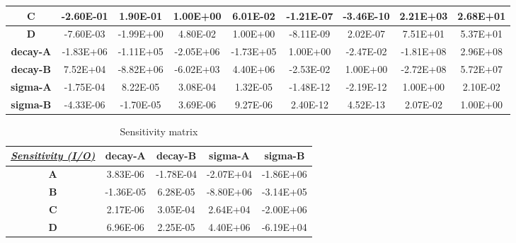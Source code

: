 \begin{landscape}
\begin{table}[h!]
\begin{tabular}{|c|c|c|c|c|c|c|c|c|}
\textbf{C}                                   & -2.60E-01  & 1.90E-01   & 1.00E+00   & 6.01E-02   & -1.21E-07        & -3.46E-10        & 2.21E+03         & 2.68E+01         \\ \hline
\textbf{D}                                   & -7.60E-03  & -1.99E+00  & 4.80E-02   & 1.00E+00   & -8.11E-09        & 2.02E-07         & 7.51E+01         & 5.37E+01         \\ \hline
\textbf{decay-A}                             & -1.83E+06  & -1.11E+05  & -2.05E+06  & -1.73E+05  & 1.00E+00         & -2.47E-02        & -1.81E+08        & 2.96E+08         \\ \hline
\textbf{decay-B}                             & 7.52E+04   & -8.82E+06  & -6.02E+03  & 4.40E+06   & -2.53E-02        & 1.00E+00         & -2.72E+08        & 5.72E+07         \\ \hline
\textbf{sigma-A}                             & -1.75E-04  & 8.22E-05   & 3.08E-04   & 1.32E-05   & -1.48E-12        & -2.19E-12        & 1.00E+00         & 2.10E-02         \\ \hline
\textbf{sigma-B}                             & -4.33E-06  & -1.70E-05  & 3.69E-06   & 9.27E-06   & 2.40E-12         & 4.52E-13         & 2.07E-02         & 1.00E+00         \\ \hline
\end{tabular}
\end{table}
\begin{table}[h!]
\centering
\caption{Sensitivity matrix}
\label{SensitivityComputed}
\begin{tabular}{|c|c|c|c|c|}
\hline
{\ul \textit{\textbf{Sensitivity (I/O)}}} & \textbf{decay-A} & \textbf{decay-B} & \textbf{sigma-A} & \textbf{sigma-B} \\ \hline
\textbf{A}                                & 3.83E-06         & -1.78E-04        & -2.07E+04        & -1.86E+06        \\ \hline
\textbf{B}                                & -1.36E-05        & 6.28E-05         & -8.80E+06        & -3.14E+05        \\ \hline
\textbf{C}                                & 2.17E-06         & 3.05E-04         & 2.64E+04         & -2.00E+06        \\ \hline
\textbf{D}                                & 6.96E-06         & 2.25E-05         & 4.40E+06         & -6.19E+04        \\ \hline
\end{tabular}
\end{table}
\end{landscape}

